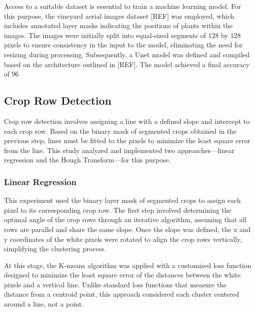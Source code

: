 \documentclass[conference]{IEEEtran}
\begin{document}
Access to a suitable dataset is essential to train a machine learning model. For this purpose, the vineyard aerial images dataset [REF] was employed, which includes annotated layer masks indicating the positions of plants within the images. The images were initially split into equal-sized segments of 128 by 128 pixels to ensure consistency in the input to the model, eliminating the need for resizing during processing. Subsequently, a Unet model was defined and compiled based on the architecture outlined in [REF]. The model achieved a final accuracy of 96%

\subsection{Crop Row Detection}
Crop row detection involves assigning a line with a defined slope and intercept to each crop row. Based on the binary mask of segmented crops obtained in the previous step, lines must be fitted to the pixels to minimize the least square error from the line. This study analyzed and implemented two approaches—linear regression and the Hough Transform—for this purpose.

\subsubsection{Linear Regression}
This experiment used the binary layer mask of segmented crops to assign each pixel to its corresponding crop row. The first step involved determining the optimal angle of the crop rows through an iterative algorithm, assuming that all rows are parallel and share the same slope. Once the slope was defined, the x and y coordinates of the white pixels were rotated to align the crop rows vertically, simplifying the clustering process.

At this stage, the K-means algorithm was applied with a customized loss function designed to minimize the least square error of the distances between the white pixels and a vertical line. Unlike standard loss functions that measure the distance from a centroid point, this approach considered each cluster centered around a line, not a point.
\end{document}
